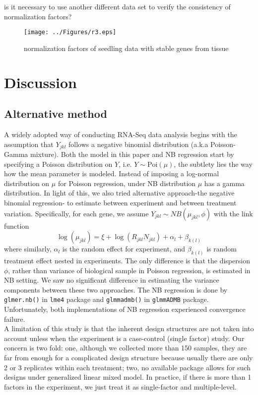\documentclass[11pt, a4paper]{article}
\begin{document}
{\color{blue} is it necessary to use another different data set to verify the consistency of normalization factors?}

 \begin{figure}[h!]
\begin{center}
\texttt{[image: ../Figures/r3.eps]}
\caption{\label{fig:scaled_diss} normalization factors of seedling data with stable genes from tissue }
\end{center}
\end{figure}

  \section{Discussion}

  \subsection{Alternative method}
A widely adopted way of conducting RNA-Seq data analysis begins with the assumption that $Y_{jkl}$ follows a negative binomial distribution (a.k.a Poisson-Gamma mixture). Both the model in this paper and NB regression start by specifying a Poisson distribution on $Y$, i.e. $Y\sim \text{Poi}(\mu)$, the subtlety lies the way how the mean parameter is modeled. Instead of imposing a log-normal distribution on $\mu$ for Poisson regression, under NB distribution $\mu$ has a gamma distribution.  In light of this, we also tried alternative approach-the negative binomial regression- to estimate between experiment and between treatment variation. Specifically,  for each gene, we assume $Y_{jkl}\sim NB(\mu_{jkl}, \phi)$ with the link function
 \[\log(\mu_{jkl})= \xi + \log(R_{jkl}N_{jkl}) + \alpha_l + \beta_{k(l)}\]
where similarly, $\alpha_l$ is the random effect for experiment, and $\beta_{k(l)}$ is random treatment effect nested in experiments.  The only difference is that the dispersion $\phi$, rather than variance of biological sample in Poisson regression, is estimated in NB setting. We saw no significant difference in estimating the variance components between these two approaches. The NB regression is done by \verb"glmer.nb()" in \verb"lme4" package\citep{bates2012lme4} and \verb"glmmadmb()" in \verb"glmmADMB" package\citep{bolker2012getting}. Unfortunately, both implementations of NB regression experienced convergence failure. \\

A limitation of this study is that the inherent design structures are not taken into account unless when the experiment is a case-control (single factor) study. Our concern is two fold: one, although we collected more than 150 samples, they are far from enough for a complicated design structure because usually there are only 2 or 3 replicates within each treatment;  two, no available package allows for such designs under generalized linear mixed model.  In practice, if there is more than 1 factors in the experiment, we just treat it as single-factor and multiple-level. 
\end{document}

